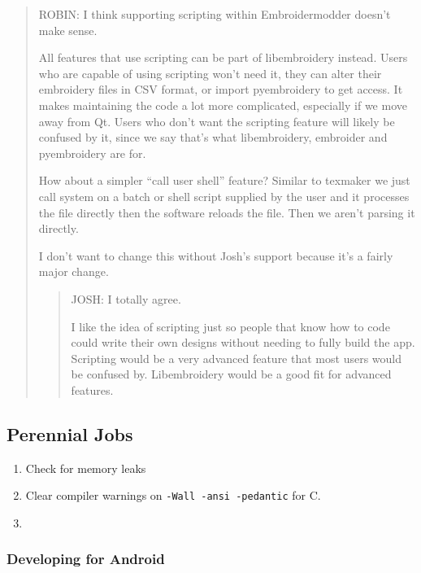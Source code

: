 \documentclass[a4paper, 11pt]{report}
\begin{document}
\begin{quote}
ROBIN: I think supporting scripting within Embroidermodder doesn't make
sense.

All features that use scripting can be part of libembroidery instead.
Users who are capable of using scripting won't need it, they can alter
their embroidery files in CSV format, or import pyembroidery to get
access. It makes maintaining the code a lot more complicated, especially
if we move away from Qt. Users who don't want the scripting feature will
likely be confused by it, since we say that's what libembroidery,
embroider and pyembroidery are for.

How about a simpler ``call user shell'' feature? Similar to texmaker we
just call system on a batch or shell script supplied by the user and it
processes the file directly then the software reloads the file. Then we
aren't parsing it directly.

I don't want to change this without Josh's support because it's a fairly
major change.

\begin{quote}
JOSH: I totally agree.

I like the idea of scripting just so people that know how to code could
write their own designs without needing to fully build the app.
Scripting would be a very advanced feature that most users would be
confused by. Libembroidery would be a good fit for advanced features.
\end{quote}
\end{quote}

\hypertarget{perennial-jobs}{%
\subsection{Perennial Jobs}\label{perennial-jobs}}

\begin{enumerate}
\def\labelenumi{\arabic{enumi}.}
\item
  Check for memory leaks
\item
  Clear compiler warnings on \texttt{-Wall\ -ansi\ -pedantic} for C.
\item
\end{enumerate}

\hypertarget{developing-for-android}{%
\subsubsection{Developing for Android}\label{developing-for-android}}
\end{document}
